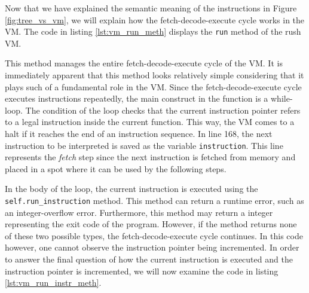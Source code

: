 Now that we have explained the semantic meaning of the instructions in Figure \ref{fig:tree_vs_vm}, we will explain how the fetch-decode-execute cycle works in the VM.
The code in listing \ref{lst:vm_run_meth} displays the \texttt{run} method of the rush VM.


This method manages the entire fetch-decode-execute cycle of the VM.
It is immediately apparent that this method looks relatively simple considering that it plays such of a fundamental role in the VM.
Since the fetch-decode-execute cycle executes instructions repeatedly, the main construct in the function is a while-loop.
The condition of the loop checks that the current instruction pointer refers to a legal instruction inside the current function.
This way, the VM comes to a halt if it reaches the end of an instruction sequence.
In line 168, the next instruction to be interpreted is saved as the variable \texttt{instruction}.
This line represents the \emph{fetch} step since the next instruction is fetched from memory and placed in a spot where it can be used by the following steps.

In the body of the loop, the current instruction is executed using the \texttt{self.run\_instruction} method.
This method can return a runtime error, such as an integer-overflow error.
Furthermore, this method may return a integer representing the exit code of the program.
However, if the method returns none of these two possible types, the fetch-decode-execute cycle continues.
In this code however, one cannot observe the instruction pointer being incremented.
In order to answer the final question of how the current instruction is executed and the instruction pointer is incremented, we will now examine the code in listing \ref{lst:vm_run_instr_meth}.


